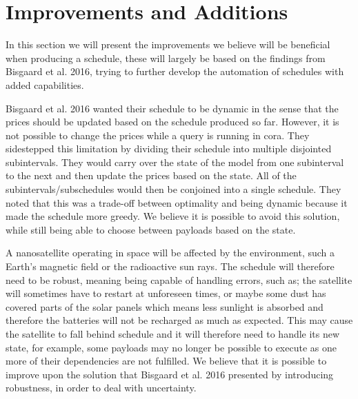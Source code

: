 \section{Improvements and Additions}\label{sec:imp_and_add}
In this section we will present the improvements we believe will be beneficial when producing a schedule, these will largely be based on the findings from Bisgaard et al. 2016\cite{gomx3}, trying to further develop the automation of schedules with added capabilities.

Bisgaard et al. 2016\cite{gomx3} wanted their schedule to be dynamic in the sense that the prices should be updated based on the schedule produced so far.
However, it is not possible to change the prices while a query is running in \gls{cora}.
They sidestepped this limitation by dividing their schedule into multiple disjointed subintervals. 
They would carry over the state of the model from one subinterval to the next and then update the prices based on the state.
All of the subintervals/subschedules would then be conjoined into a single schedule.
They noted that this was a trade-off between optimality and being dynamic because it made the schedule more greedy.
We believe it is possible to avoid this solution, while still being able to choose between payloads based on the state.

A nanosatellite operating in space will be affected by the environment, such a Earth's magnetic field or the radioactive sun rays.
The schedule will therefore need to be robust, meaning being capable of handling errors, such as; the satellite will sometimes have to restart at unforeseen times, or maybe some dust has covered parts of the solar panels which means less sunlight is absorbed and therefore the batteries will not be recharged as much as expected.
This may cause the satellite to fall behind schedule and it will therefore need to handle its new state, for example, some payloads may no longer be possible to execute as one more of their dependencies are not fulfilled. 
We believe that it is possible to improve upon the solution that Bisgaard et al. 2016\cite{gomx3} presented by introducing robustness, in order to deal with uncertainty.

